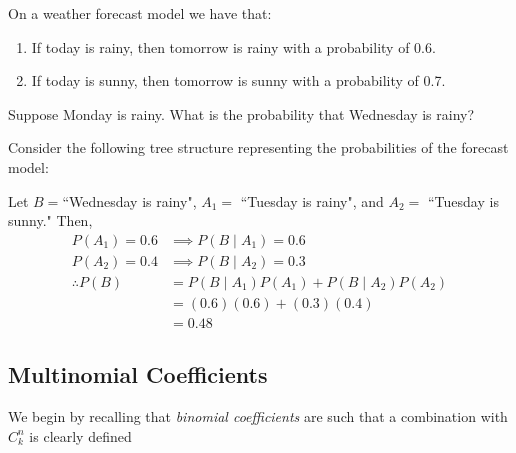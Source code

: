\documentclass{article}
\begin{document}
	\begin{exmp}
		On a weather forecast model we have that:
		\begin{enumerate}
			\item If today is rainy, then tomorrow is rainy with a probability of 0.6.
			\item If today is sunny, then tomorrow is sunny with a probability of 0.7.
		\end{enumerate}
		Suppose Monday is rainy. What is the probability that Wednesday is rainy?
		\begin{sol}
			Consider the following tree structure representing the probabilities of the forecast model:
			\begin{figure}[h]
			\end{figure}
		
			\noindent
			Let $B = $``Wednesday is rainy",  $A_1 = $ ``Tuesday is rainy", and $A_2=$ ``Tuesday is sunny." Then,
			\begin{align*}
				P(A_1) = 0.6 &\implies P(B \mid A_1) = 0.6 \\
				P(A_2) = 0.4 &\implies P(B \mid A_2) = 0.3\\
				\therefore P(B) &= P(B \mid A_1) P(A_1) + P(B \mid A_2) P(A_2) \\
				&= (0.6)(0.6) + (0.3)(0.4) \\
				&\boxed{= 0.48}
			\end{align*}
		\end{sol}
	\end{exmp}

\subsection{Multinomial Coefficients}
	We begin by recalling that \emph{binomial coefficients} are such that a combination with $C_k^n$ is clearly defined
	
\end{document}
